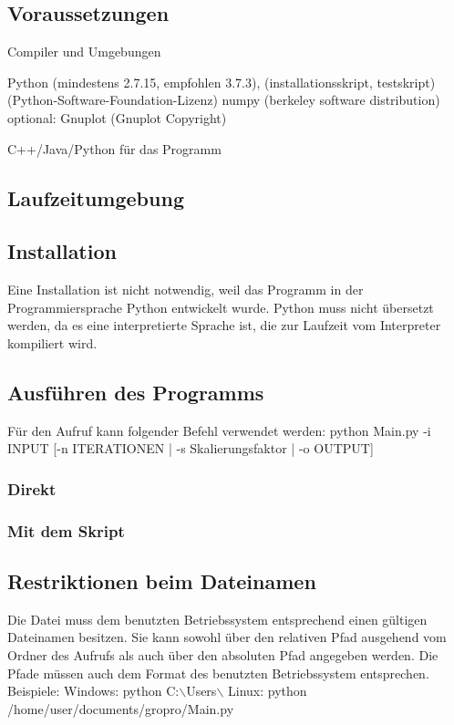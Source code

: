 \documentclass[a4paper,11pt]{article}
\begin{document}
{\subsection{Voraussetzungen}

Compiler und Umgebungen

Python (mindestens 2.7.15, empfohlen 3.7.3), (installationsskript, testskript) (Python-Software-Foundation-Lizenz)
numpy (berkeley software distribution)
optional: Gnuplot (Gnuplot Copyright)

C++/Java/Python für das Programm


\subsection{Laufzeitumgebung}

\subsection{Installation}

Eine Installation ist nicht notwendig, weil das Programm in der Programmiersprache Python entwickelt wurde. Python muss nicht übersetzt werden, da es eine interpretierte Sprache ist, die zur Laufzeit vom Interpreter kompiliert wird.

\subsection{Ausführen des Programms}
F\"ur den Aufruf kann folgender Befehl verwendet werden:
python Main.py -i INPUT [-n ITERATIONEN | -s Skalierungsfaktor | -o OUTPUT]


\subsubsection{Direkt}

\subsubsection{Mit dem Skript}

\subsection{Restriktionen beim Dateinamen}
Die Datei muss dem benutzten Betriebssystem entsprechend einen g\"ultigen Dateinamen besitzen.
Sie kann sowohl \"uber den relativen Pfad ausgehend vom Ordner des Aufrufs als auch \"uber den absoluten Pfad angegeben werden.
Die Pfade m\"ussen auch dem Format des benutzten Betriebssystem entsprechen.
Beispiele:
Windows: python \glqq C:$\backslash$Users$\backslash$\grqq{}
Linux: python /home/user/documents/gropro/Main.py

}
\end{document}
